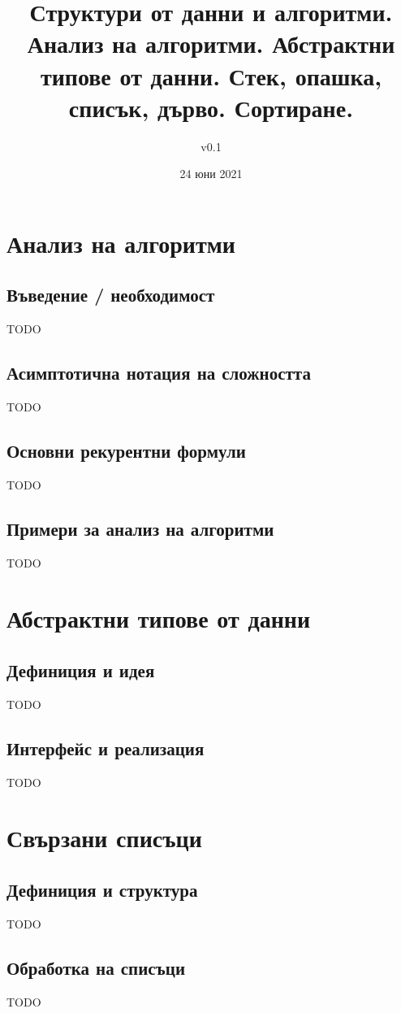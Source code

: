 \documentclass[fleqn,12pt]{article}
\title{Структури от данни и алгоритми. Анализ на алгоритми. Абстрактни
типове от данни. Стек, опашка, списък, дърво. Сортиране.}
\author{v0.1}
\date{24 юни 2021}
\begin{document}
\maketitle

\tableofcontents

\section{Анализ на алгоритми}
\subsection{Въведение / необходимост}
TODO

\subsection{Асимптотична нотация на сложността}
TODO

\subsection{Основни рекурентни формули}
TODO

\subsection{Примери за анализ на алгоритми}
TODO

\section{Абстрактни типове от данни}
\subsection{Дефиниция и идея}
TODO

\subsection{Интерфейс и реализация}
TODO

\section{Свързани списъци}
\subsection{Дефиниция и структура}
TODO

\subsection{Обработка на списъци}
TODO
\end{document}
